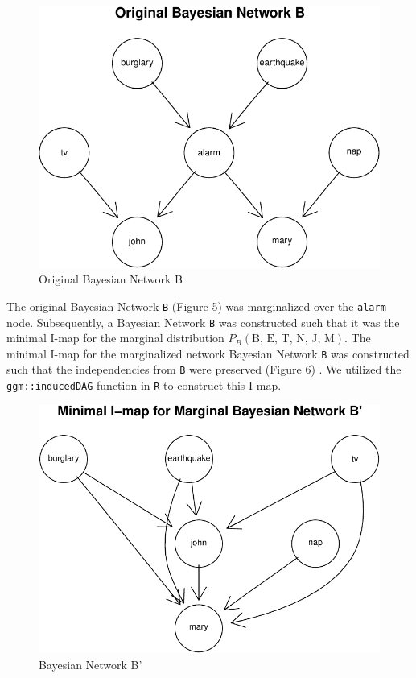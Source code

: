 \documentclass[]{article}
\begin{document}
\begin{figure}

{\centering \includegraphics{sta546_hw3_files/figure-latex/unnamed-chunk-9-1} 

}

\caption{Original Bayesian Network B}\label{fig:unnamed-chunk-9}
\end{figure}

The original Bayesian Network \texttt{B} (Figure 5) was marginalized
over the \texttt{alarm} node. Subsequently, a Bayesian Network
\texttt{B\textquotesingle{}} was constructed such that it was the
minimal I-map for the marginal distribution
\(P_{B}(\text{B, E, T, N, J, M})\). The minimal I-map for the
marginalized network Bayesian Network \texttt{B\textquotesingle{}} was
constructed such that the independencies from \texttt{B} were preserved
(Figure 6) . We utilized the \texttt{ggm::inducedDAG} function in
\texttt{R} to construct this I-map.

\begin{figure}

{\centering \includegraphics{sta546_hw3_files/figure-latex/unnamed-chunk-10-1} 

}

\caption{Bayesian Network B'}\label{fig:unnamed-chunk-10}
\end{figure}
\end{document}
